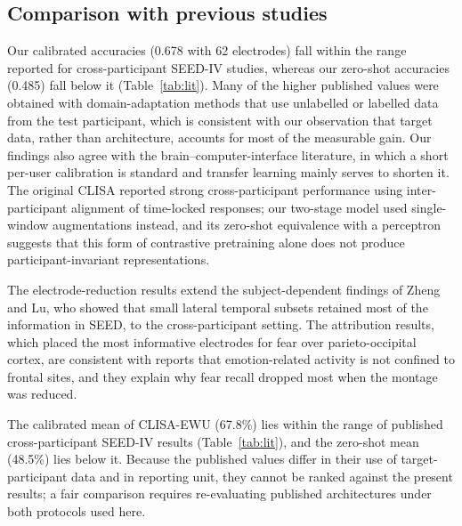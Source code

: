 \subsection{Comparison with previous studies}
Our calibrated accuracies (0.678 with 62 electrodes) fall within the range reported for cross-participant SEED-IV studies, whereas our zero-shot accuracies (0.485) fall below it (Table~\ref{tab:lit}). Many of the higher published values were obtained with domain-adaptation methods that use unlabelled or labelled data from the test participant\cite{dan,bidann,rgnn,plugplay}, which is consistent with our observation that target data, rather than architecture, accounts for most of the measurable gain. Our findings also agree with the brain–computer-interface literature, in which a short per-user calibration is standard and transfer learning mainly serves to shorten it\cite{lotte,jayaram,wu}. The original CLISA reported strong cross-participant performance using inter-participant alignment of time-locked responses\cite{clisa}; our two-stage model used single-window augmentations instead, and its zero-shot equivalence with a perceptron suggests that this form of contrastive pretraining alone does not produce participant-invariant representations.

The electrode-reduction results extend the subject-dependent findings of Zheng and Lu, who showed that small lateral temporal subsets retained most of the information in SEED\cite{seed}, to the cross-participant setting. The attribution results, which placed the most informative electrodes for fear over parieto-occipital cortex, are consistent with reports that emotion-related activity is not confined to frontal sites\cite{alarcao,jenke}, and they explain why fear recall dropped most when the montage was reduced.

The calibrated mean of CLISA-EWU (67.8\%) lies within the range of published cross-participant SEED-IV results (Table~\ref{tab:lit}), and the zero-shot mean (48.5\%) lies below it. Because the published values differ in their use of target-participant data and in reporting unit, they cannot be ranked against the present results; a fair comparison requires re-evaluating published architectures under both protocols used here.


